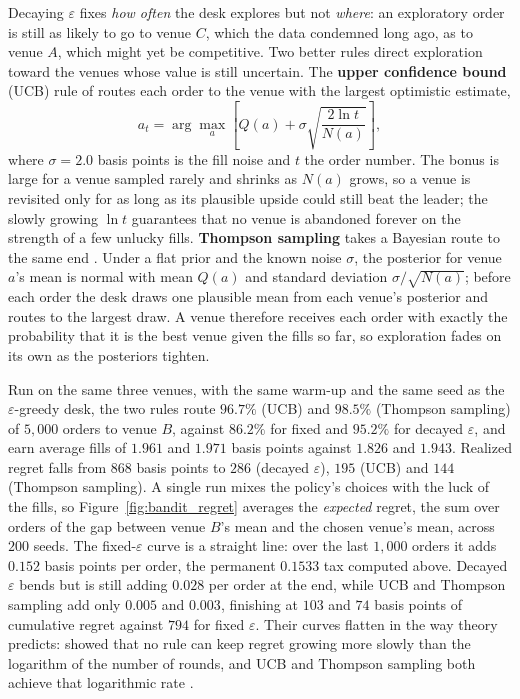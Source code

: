 \documentclass[../ai_in_finance]{subfiles}
\begin{document}
Decaying $\varepsilon$ fixes \emph{how often} the desk explores but not \emph{where}: an exploratory order is still as likely to go to venue $C$, which the data condemned long ago, as to venue $A$, which might yet be competitive. Two better rules direct exploration toward the venues whose value is still uncertain. The \textbf{upper confidence bound} (UCB) rule of \textcite{auer2002finite} routes each order to the venue with the largest optimistic estimate,
\begin{equation}
a_t = \arg\max_a \left[ Q(a) + \sigma\sqrt{\frac{2\ln t}{N(a)}} \right],
\label{eq:rl-ucb}
\end{equation}
where $\sigma=2.0$ basis points is the fill noise and $t$ the order number. The bonus is large for a venue sampled rarely and shrinks as $N(a)$ grows, so a venue is revisited only for as long as its plausible upside could still beat the leader; the slowly growing $\ln t$ guarantees that no venue is abandoned forever on the strength of a few unlucky fills. \textbf{Thompson sampling} takes a Bayesian route to the same end \parencite{russo2018tutorial}. Under a flat prior and the known noise $\sigma$, the posterior for venue $a$'s mean is normal with mean $Q(a)$ and standard deviation $\sigma/\sqrt{N(a)}$; before each order the desk draws one plausible mean from each venue's posterior and routes to the largest draw. A venue therefore receives each order with exactly the probability that it is the best venue given the fills so far, so exploration fades on its own as the posteriors tighten.

Run on the same three venues, with the same warm-up and the same seed as the $\varepsilon$-greedy desk, the two rules route $96.7\%$ (UCB) and $98.5\%$ (Thompson sampling) of $5{,}000$ orders to venue $B$, against $86.2\%$ for fixed and $95.2\%$ for decayed $\varepsilon$, and earn average fills of $1.961$ and $1.971$ basis points against $1.826$ and $1.943$. Realized regret falls from $868$ basis points to $286$ (decayed $\varepsilon$), $195$ (UCB) and $144$ (Thompson sampling). A single run mixes the policy's choices with the luck of the fills, so Figure~\ref{fig:bandit_regret} averages the \emph{expected} regret, the sum over orders of the gap between venue $B$'s mean and the chosen venue's mean, across $200$ seeds. The fixed-$\varepsilon$ curve is a straight line: over the last $1{,}000$ orders it adds $0.152$ basis points per order, the permanent $0.1533$ tax computed above. Decayed $\varepsilon$ bends but is still adding $0.028$ per order at the end, while UCB and Thompson sampling add only $0.005$ and $0.003$, finishing at $103$ and $74$ basis points of cumulative regret against $794$ for fixed $\varepsilon$. Their curves flatten in the way theory predicts: \textcite{lai1985asymptotically} showed that no rule can keep regret growing more slowly than the logarithm of the number of rounds, and UCB and Thompson sampling both achieve that logarithmic rate \parencite{lattimore2020bandit}.
\end{document}

